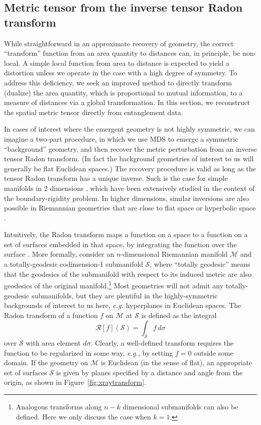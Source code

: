 \documentclass[%
preprint,
nofootinbib,
amsmath,amssymb,
aps,
prd,
showpacs,
superscriptaddress
]{revtex4-1}
\newcommand{\R}{\mathscr{R}}
\begin{document}
\subsection{Metric tensor from the inverse tensor Radon transform}
\label{sec:metricfromradon}

While straightforward in an approximate recovery of geometry, the correct ``transform'' function from an area quantity to distances can, in principle, be non-local. A simple local function from area to distance is expected to yield a distortion unless we operate in the case with a high degree of symmetry. To address this deficiency, we seek an improved method to directly transform (dualize) the area quantity, which is proportional to mutual information, to a measure of distances via a global transformation. In this section, we reconstruct the spatial metric tensor directly from entanglement data.

In cases of interest where the emergent geometry is not highly symmetric, we can imagine a two-part procedure, in which we use MDS to emerge a symmetric ``background'' geometry, and then recover the metric perturbation from an inverse tensor Radon transform. 
(In fact the background geometries of interest to us will generally be flat Euclidean spaces.)
The recovery procedure is valid as long as the tensor Radon transform has a unique inverse. Such is the case for simple manifolds in 2 dimensions  \cite{BRP2dproof}, which have been extensively studied in the context of the boundary-rigidity problem. In higher dimensions, similar inversions are also possible in Riemannian geometries that are close to flat space or hyperbolic space \cite{uhlmann}.

Intuitively, the Radon transform maps a function on a space to a function on a set of surfaces embedded in that space, by integrating the function over the surface  \cite{helgason1999Radon,sharafutdinov1994integral,Czech:2016tqr}.
More formally, consider an $n$-dimensional Riemannian manifold $\mathcal{M}$ and a totally-geodesic codimension-1 submanifold $\mathcal{S}$, where ``totally geodesic'' means that the geodesics of the submanifold with respect to its induced metric are also geodesics of the original manifold.\footnote{Analogous transforms along $n-k$ dimensional submanifolds can also be defined. Here we only discuss the case when $k=1$.} 
Most geometries will not admit any totally-geodesic submanifolds, but they are plentiful in the highly-symmetric backgrounds of interest to us here, \emph{e.g.} hyperplanes in Euclidean spaces.
The Radon transform of a function $f$ on $\mathcal{M}$ at $\mathcal{S}$ is defined as the integral 
\begin{equation}
\R[f](\mathcal{S}) = \int_{\mathcal{S}} f\, d\sigma
\end{equation}
over $\mathcal{S}$ with area element $d\sigma$. 
Clearly, a well-defined transform requires the function to be regularized in some way, \textit{e.g.,} by setting $f=0$ outside some domain. 
If the geometry on $\mathcal{M}$ is Euclidean (in the sense of flat), an appropriate set of surfaces $\mathcal{S}$ is given by planes specified by a distance and angle from the origin, as shown in Figure~\ref{fig:xraytransform}.
\end{document}
